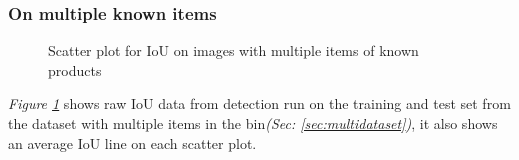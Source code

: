 \subsubsection{On multiple known items} \label{sec:v3resontrained}
\begin{figure}[h]
    \centering
    \hfill
    \hfill
    \hfill
    \caption{Scatter plot for IoU on images with multiple items of known products} %
    \label{figure: v3knownproducts}
\end{figure}
\textit{Figure \ref{figure: v3knownproducts}} shows raw IoU data from detection run on the training and test set from the dataset with multiple items in the bin\textit{(Sec: \ref{sec:multidataset})}, it also shows an average IoU line on each scatter plot.


